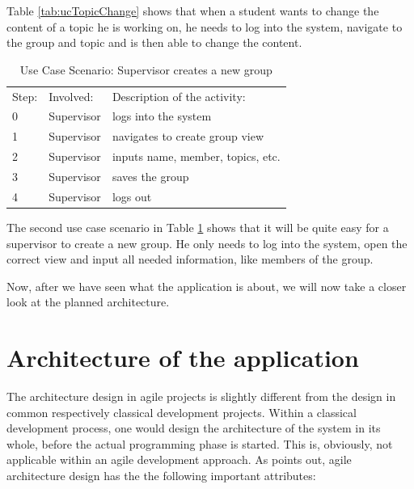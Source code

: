 Table \ref{tab:ucTopicChange} shows that when a student wants to change the content of a topic he is working on, he needs to log into the system, navigate to the group and topic and is then able to change the content.
 
 \begin{table}[h]
\scriptsize
 \caption{Use Case Scenario: Supervisor creates a new group}
 \begin{tabular}{lll}
	\toprule
  Step: & Involved: & Description of the activity: \\ 
\cmidrule(rl){1-1}\cmidrule(rl){2-2}\cmidrule(rl){3-3}
  	0 	& Supervisor & logs into the system \\
	1	& Supervisor & navigates to create group view \\
	2	& Supervisor & inputs name, member, topics, etc. \\
	3	& Supervisor & saves the group \\	
	4	& Supervisor & logs out \\
	\bottomrule
 \end{tabular}
 \label{tab:ucGroupCreation}
 \end{table} 

The second use case scenario in Table \ref{tab:ucGroupCreation} shows that it will be quite easy for a supervisor to create a new group. He only needs to log into the system, open the correct view and input all needed information, like members of the group. 



Now, after we have seen what the application is about, we will now take a closer look at the planned architecture.

\section{Architecture of the application}
\label{architecture}
The architecture design in agile projects is slightly different from the design in common respectively classical development projects. Within a classical development process, one would design the architecture of the system in its whole, before the actual programming phase is started. This is, obviously, not applicable within an agile development approach. As \cite{Mast2013} points out, agile architecture design has the the following important attributes:

